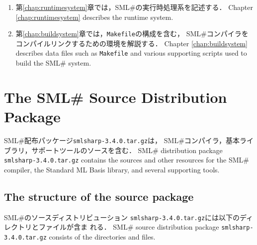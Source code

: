 \documentclass{jbook}
\newcommand{\txt}[2]{#2}
\newcommand{\smlsharp}{SML\#}
\newcommand{\version}{3.4.0}
\newcommand{\code}[1]{\mbox{\large\tt #1}}
\begin{document}
\begin{enumerate}
\item
\ifjp%
	第\ref{chap:runtimesystem}章では，\smlsharp{}の実行時処理系を記述する．
\else%
	Chapter \ref{chap:runtimesystem} describes the runtime system.
\fi%

\item 
\ifjp%
	第\ref{chap:buildsystem}章では，\code{Makefile}の構成を含む，
\smlsharp{}コンパイラをコンパイルリンクするための環境を解説する．
\else%
	Chapter \ref{chap:buildsystem} describes data files such as
\code{Makefile} and various supporting scripts used to build the
\smlsharp{} system. 
\fi%
\fi
\end{enumerate}

\chapter{\txt{\smlsharp{}ソースパッケージ}{The \smlsharp{} Source Distribution Package}}
\label{chap:package}

\ifjp%
	\smlsharp{}配布パッケージ\code{smlsharp-\version{}.tar.gz}は，
\smlsharp{}コンパイラ，基本ライブラリ，サポートツールのソースを含む．
\else%
	\smlsharp{} distribution package \code{smlsharp-\version{}.tar.gz}
contains the sources and other resources for the \smlsharp{} compiler,
the Standard ML Basis library, and several supporting tools.
\fi%

\section{\txt
{ソースパッケージの構成}{The structure of the source package}
}

\ifjp%
	\smlsharp{}のソースディストリビューション
\code{smlsharp-\version{}.tar.gz}には以下のディレクトリとファイルが含ま
れる．
\else%
	\smlsharp{} source distribution package 
\code{smlsharp-\version{}.tar.gz} 
consists of the directories and files.
\fi%
\end{document}
